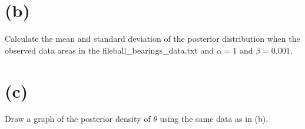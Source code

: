 \documentclass[
  10pt,
]{article}
\begin{document}
\hypertarget{b}{%
\section*{(b)}\label{b}}

Calculate the mean and standard deviation of the posterior distribution when the observed data areas in the fileball\_bearings\_data.txt and \(\alpha = 1\) and \(\beta= 0.001\).

\hypertarget{c}{%
\section*{(c)}\label{c}}

Draw a graph of the posterior density of \(\theta\) using the same data as in (b).
\end{document}
